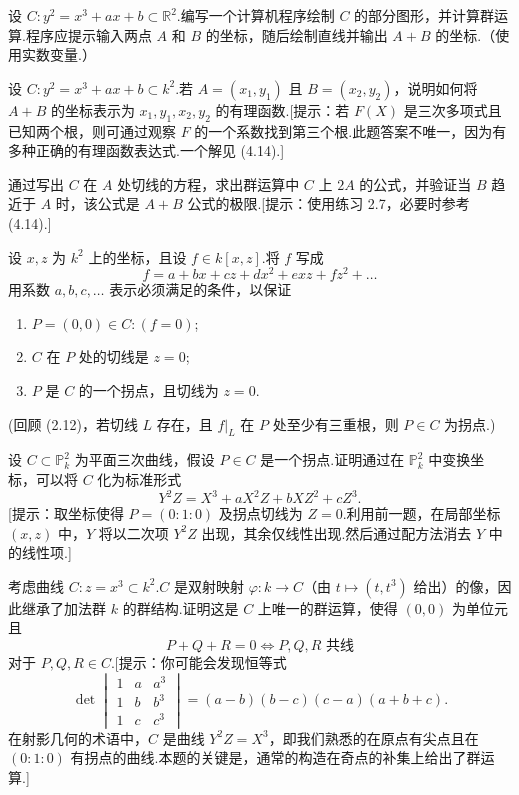 \begin{exercise}
设 \(C: y^2 = x^3 + ax + b \subset \mathbb{R}^2\).编写一个计算机程序绘制 \(C\) 的部分图形，并计算群运算.程序应提示输入两点 \(A\) 和 \(B\) 的坐标，随后绘制直线并输出 \(A+B\) 的坐标.（使用实数变量.）
\end{exercise}

\begin{exercise}
设 \(C: y^2 = x^3 + ax + b \subset k^2\).若 \(A=(x_1, y_1)\) 且 \(B=(x_2, y_2)\)，说明如何将 \(A+B\) 的坐标表示为 \(x_1, y_1, x_2, y_2\) 的有理函数.[提示：若 \(F(X)\) 是三次多项式且已知两个根，则可通过观察 \(F\) 的一个系数找到第三个根.此题答案不唯一，因为有多种正确的有理函数表达式.一个解见 (4.14).]
\end{exercise}

\begin{exercise}
通过写出 \(C\) 在 \(A\) 处切线的方程，求出群运算中 \(C\) 上 \(2A\) 的公式，并验证当 \(B\) 趋近于 \(A\) 时，该公式是 \(A+B\) 公式的极限.[提示：使用练习 2.7，必要时参考 (4.14).]
\end{exercise}

\begin{exercise}
设 \(x, z\) 为 \(k^2\) 上的坐标，且设 \(f \in k[x, z]\).将 \(f\) 写成
\[
f = a + bx + cz + dx^2 + exz + fz^2 + \dots
\]
用系数 \(a, b, c, \dots\) 表示必须满足的条件，以保证
\begin{enumerate}
    \item[(i)] \(P=(0,0) \in C: (f=0)\);
    \item[(ii)] \(C\) 在 \(P\) 处的切线是 \(z=0\);
    \item[(iii)] \(P\) 是 \(C\) 的一个拐点，且切线为 \(z=0\).
\end{enumerate}
(回顾 (2.12)，若切线 \(L\) 存在，且 \(f|_L\) 在 \(P\) 处至少有三重根，则 \(P \in C\) 为拐点.)
\end{exercise}

\begin{exercise}
设 \(C \subset \mathbb{P}^2_k\) 为平面三次曲线，假设 \(P \in C\) 是一个拐点.证明通过在 \(\mathbb{P}^2_k\) 中变换坐标，可以将 \(C\) 化为标准形式
\[
Y^2 Z = X^3 + aX^2 Z + bXZ^2 + cZ^3.
\]
[提示：取坐标使得 \(P=(0:1:0)\) 及拐点切线为 \(Z=0\).利用前一题，在局部坐标 \((x,z)\) 中，\(Y\) 将以二次项 \(Y^2 Z\) 出现，其余仅线性出现.然后通过配方法消去 \(Y\) 中的线性项.]
\end{exercise}

\begin{exercise}[尖点三次曲线上的群运算]
考虑曲线 \(C: z = x^3 \subset k^2\).\(C\) 是双射映射 \(\varphi: k \to C\)（由 \(t \mapsto (t, t^3)\) 给出）的像，因此继承了加法群 \(k\) 的群结构.证明这是 \(C\) 上唯一的群运算，使得 \((0,0)\) 为单位元且
\[
P+Q+R=0 \iff P, Q, R \text{ 共线}
\]
对于 \(P, Q, R \in C\).[提示：你可能会发现恒等式
\[
\det \begin{vmatrix} 1 & a & a^3 \\ 1 & b & b^3 \\ 1 & c & c^3 \end{vmatrix} = (a-b)(b-c)(c-a)(a+b+c).
\]
在射影几何的术语中，\(C\) 是曲线 \(Y^2 Z = X^3\)，即我们熟悉的在原点有尖点且在 \((0:1:0)\) 有拐点的曲线.本题的关键是，通常的构造在奇点的补集上给出了群运算.]
\end{exercise}

